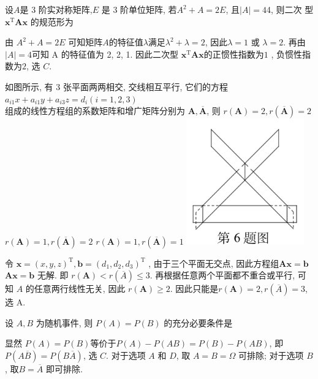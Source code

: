 \documentclass[kindlepaper]{BHCexam4kindle}
\begin{document}
\begin{questions}
		\qs 设$A$是 3 阶实对称矩阵,$E$ 是 3 阶单位矩阵, 若$A^{2}+A=2 E$, 且$|A|=4$4, 则二次
		型 $\boldsymbol{x}^{\mathrm{T}} \boldsymbol{A} \boldsymbol{x}$ 的规范形为\xx
		\begin{solution}
			由 $A^{2}+A=2 E$ 可知矩阵$A$的特征值$\lambda$满足$\lambda^{2}+\lambda=2$, 因此$\lambda=1$ 或 $\lambda=2$. 再由
			$|A|=4$可知 A 的特征值为 2, 2, 1. 因此二次型 $\boldsymbol{x}^{\mathrm{T}} \boldsymbol{A} \boldsymbol{x}$的正惯性指数为$1$ , 负惯性指数为$2$, 选 $C$.
		\end{solution}

		\qs 如图所示, 有 3 张平面两两相交, 交线相互平行, 它们的方程\\
		$a_{i 1} x+a_{i 1} y+a_{i 3} z=d_{i}(i=1,2,3)$\\
		组成的线性方程组的系数矩阵和增广矩阵分别为 $\boldsymbol{A}, \overline{\boldsymbol{A}}$, 则\xx
		{$r(\boldsymbol{A})=2, r(\overline{\boldsymbol{A}})=2$}
		{$r(\boldsymbol{A})=1, r(\overline{\boldsymbol{A}})=2$}
		{$r(\boldsymbol{A})=1, r(\overline{\boldsymbol{A}})=1$}
		\includegraphics[width=2in]{img-2019/2019-06} 
		\begin{solution}
			令 $\boldsymbol{x}=(x, y, z)^{\mathrm{T}}, \boldsymbol{b}=\left(d_{1}, d_{2}, d_{3}\right)^{\mathrm{T}}$ , 由于三个平面无交点, 因此方程组$\boldsymbol{A x}=\boldsymbol{b}$$\boldsymbol{A x}=\boldsymbol{b}$ 无解.
		即 $r(\boldsymbol{A})<r(\overline{A}) \leqslant 3$. 再根据任意两个平面都不重合或平行, 可知 $A$ 的任意两行线性无关,
		因此 $r(\boldsymbol{A}) \geqslant 2$. 因此只能是$r(\boldsymbol{A})=2, r(\overline{A})=3$, 选 A.
		\end{solution}

		\qs 设 $A, B$ 为随机事件, 则 $P(A)=P(B)$ 的充分必要条件是\xx
		\begin{solution}
			显然 $P(A)=P(B)$等价于$P(A)-P(A B)=P(B)-P(A B)$, 即$P(A \overline{B})=P(B \overline{A})$,
			选 $C$. 对于选项 $A$ 和 $D$, 取 $A=B=\Omega$ 可排除; 对于选项 $B$, 取$B=\overline{A}$ 即可排除.
		\end{solution}


\end{questions}
\end{document}
